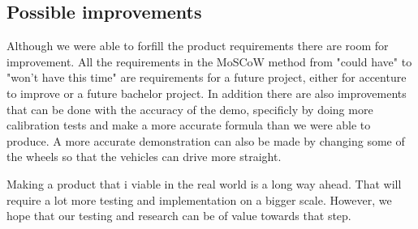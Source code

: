 \subsection{Possible improvements}

Although we were able to forfill the product requirements there are room for improvement. All the requirements in the MoSCoW method from "could have" to "won't have this time" are requirements for a future project, either for accenture to improve or a future bachelor project. In addition there are also improvements that can be done with the accuracy of the demo, specificly by doing more calibration tests and make a more accurate formula than we were able to produce. A more accurate demonstration can also be made by changing some of the wheels so that the vehicles can drive more straight. 

Making a product that i viable in the real world is a long way ahead. That will require a lot more testing and implementation on a bigger scale. However, we hope that our testing and research can be of value towards that step.